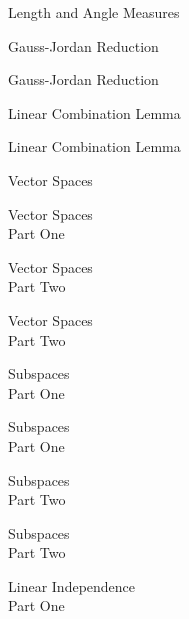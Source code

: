 \documentclass{titlescreen}
\begin{document}
\begin{videotitle}
  Length and Angle Measures 
\end{videotitle}
\begin{videoend}
  Gauss-Jordan Reduction 
\end{videoend}


\begin{videotitle}
  Gauss-Jordan Reduction 
\end{videotitle}
\begin{videoend}
  Linear Combination Lemma 
\end{videoend}

\begin{videotitle}
  Linear Combination Lemma 
\end{videotitle}
\begin{videoend}
  Vector Spaces
\end{videoend}



\begin{videotitle}
  Vector Spaces  \\[1ex]
  Part One
\end{videotitle}
\begin{videoend}
  Vector Spaces \\[1ex]
  Part Two 
\end{videoend}

% 
\begin{videotitle}
  Vector Spaces  \\[1ex]
  Part Two
\end{videotitle}
\begin{videoend}
  Subspaces \\[1ex]
  Part One
\end{videoend}

\begin{videotitle}
  Subspaces  \\[1ex]
  Part One
\end{videotitle}
\begin{videoend}
  Subspaces \\[1ex]
  Part Two 
\end{videoend}

% 
\begin{videotitle}
  Subspaces  \\[1ex]
  Part Two
\end{videotitle}
\begin{videoend}
  Linear Independence \\[1ex]
  Part One
\end{videoend}
\end{document}
